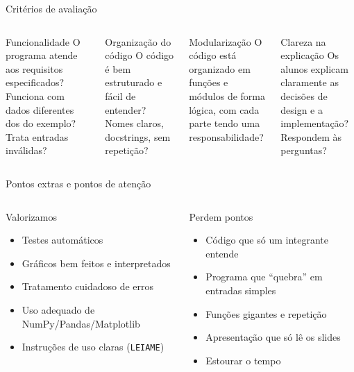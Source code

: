 \documentclass[aspectratio=169,10pt,t]{beamer}
\begin{document}
\begin{frame}{Critérios de avaliação}
  \begin{columns}[T]
    \begin{block}{Funcionalidade}
      O programa atende aos requisitos especificados? Funciona com dados diferentes dos do exemplo? Trata entradas inválidas?
    \end{block}
    \begin{block}{Organização do código}
      O código é bem estruturado e fácil de entender? Nomes claros, docstrings, sem repetição?
    \end{block}
    \begin{block}{Modularização}
      O código está organizado em funções e módulos de forma lógica, com cada parte tendo uma responsabilidade?
    \end{block}
    \begin{block}{Clareza na explicação}
      Os alunos explicam claramente as decisões de design e a implementação? Respondem às perguntas?
    \end{block}
  \end{columns}
\end{frame}

\begin{frame}{Pontos extras e pontos de atenção}
  \begin{columns}[T]
    \begin{exampleblock}{Valorizamos}
      \begin{itemize}\small
        \item Testes automáticos
        \item Gráficos bem feitos e interpretados
        \item Tratamento cuidadoso de erros
        \item Uso adequado de NumPy/Pandas/Matplotlib
        \item Instruções de uso claras (\texttt{LEIAME})
      \end{itemize}
    \end{exampleblock}
    \begin{alertblock}{Perdem pontos}
      \begin{itemize}\small
        \item Código que só um integrante entende
        \item Programa que ``quebra'' em entradas simples
        \item Funções gigantes e repetição
        \item Apresentação que só lê os slides
        \item Estourar o tempo
      \end{itemize}
    \end{alertblock}
  \end{columns}
\end{frame}
\end{document}
